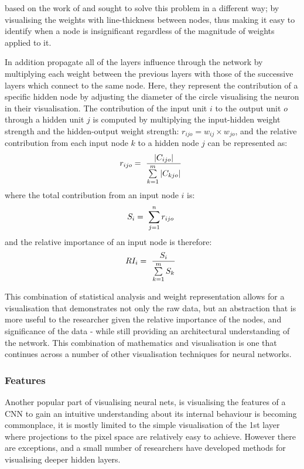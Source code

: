 \documentclass[a4paper,11pt,titlepage]{article}
\begin{document}
	\cite{Tzeng2005} based on the work of 	\cite{Garson1991} and \cite{Goh1995} sought to solve this problem in a different way; by visualising the weights with line-thickness between nodes, thus making it easy to identify when a node is insignificant regardless of the magnitude of weights applied to it.
	\par 
	In addition 	\cite{Tzeng2005} propagate all of the layers influence through the network by multiplying each weight between the previous layers with those of the successive layers which connect to the same node. Here, they represent the contribution of a specific hidden node by adjusting the diameter of the circle visualising the neuron in their visualisation. The contribution of the input unit $ i $ to the output unit $ o $ through a hidden unit $ j $ is computed by multiplying the input-hidden weight strength and the hidden-output weight strength:
$ r_{ijo} = w_{ij} \times w_{jo} $, and the relative contribution from each input node $ k $ to a hidden node $ j $ can be represented as:
		$$
		r_{ijo} = 
		\text{ $ \frac{|C_{ijo}|}{\sum\limits_{k=1}^m |C_{kjo}| } $ }
		$$ 
	where the total contribution from an input node $ i $ is: 
		$$
		S_{i} = 
		\text{ $ \sum\limits_{j=1}^n r_{ijo} $ }
		$$ 
	and the relative importance of an input node is therefore:
		$$
		RI_{i} = 
		\text{ $ \frac{S_{i}}{\sum\limits_{k=1}^m S_{k} } $ }
		$$ 
	 \par 
 		
	 This combination of statistical analysis and weight representation allows for a visualisation that demonstrates not only the raw data, but an abstraction that is more useful to the researcher given the relative importance of the nodes, and significance of the data - while still providing an architectural understanding of the network. This combination of mathematics and visualisation is one that continues across a number of other visualisation techniques for neural networks.
	 
\subsubsection{Features}

		Another popular part of visualising neural nets, is visualising the features of a CNN to gain an intuitive understanding about its internal behaviour is becoming commonplace, it is mostly limited to the simple visualisation of the 1st layer where projections to the pixel space are relatively easy to achieve. However there are exceptions, and a small number of researchers have developed methods for visualising deeper hidden layers.
		
\end{document}
